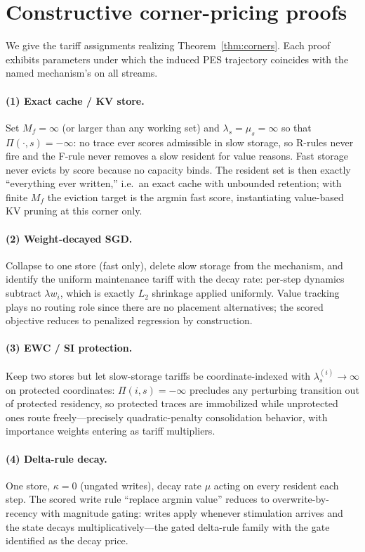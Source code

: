 \documentclass[10pt,twocolumn]{article}
\theoremstyle{definition}
\newcommand{\PES}{PES}
\begin{document}
\appendix

\section{Constructive corner-pricing proofs}\label{app:corners}
We give the tariff assignments realizing Theorem~\ref{thm:corners}. Each proof exhibits parameters under
which the induced \PES{} trajectory coincides with the named mechanism's on all streams.

\paragraph{(1) Exact cache / {KV} store.}
Set $M_f=\infty$ (or larger than any working set) and $\lambda_s=\mu_s=\infty$ so that
$\Pi(\cdot,s)=-\infty$: no trace ever scores admissible in slow storage, so R-rules never fire and the
F-rule never removes a slow resident for value reasons. Fast storage never evicts by score because no
capacity binds. The resident set is then exactly ``everything ever written,'' i.e.\ an exact cache with
unbounded retention; with finite $M_f$ the eviction target is the argmin fast score, instantiating
value-based {KV} pruning at this corner only.

\paragraph{(2) Weight-decayed {SGD}.}
Collapse to one store (fast only), delete slow storage from the mechanism, and identify the uniform
maintenance tariff with the decay rate: per-step dynamics subtract $\lambda w_i$, which is exactly $L_2$
shrinkage applied uniformly. Value tracking plays no routing role since there are no placement alternatives;
the scored objective reduces to penalized regression by construction.

\paragraph{(3) EWC / SI protection.}
Keep two stores but let slow-storage tariffs be coordinate-indexed with $\lambda_s^{(i)}\to\infty$ on
protected coordinates: $\Pi(i,s)=-\infty$ precludes any perturbing transition out of protected residency,
so protected traces are immobilized while unprotected ones route freely---precisely quadratic-penalty
consolidation behavior, with importance weights entering as tariff multipliers.

\paragraph{(4) Delta-rule decay.}
One store, $\kappa=0$ (ungated writes), decay rate $\mu$ acting on every resident each step. The scored
write rule ``replace argmin value'' reduces to overwrite-by-recency with magnitude gating: writes apply
whenever stimulation arrives and the state decays multiplicatively---the gated delta-rule family with the
gate identified as the decay price.
\end{document}
